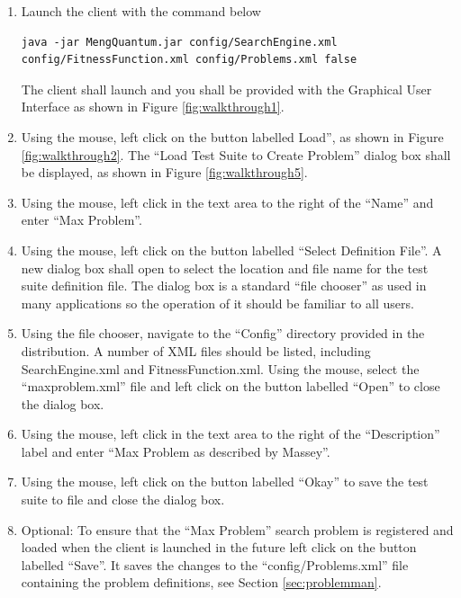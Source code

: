 \begin{enumerate}
 \item Launch the client with the command below
\begin{lstlisting}
java -jar MengQuantum.jar config/SearchEngine.xml config/FitnessFunction.xml config/Problems.xml false
\end{lstlisting}
The client shall launch and you shall be provided with the Graphical User Interface as shown in Figure \ref{fig:walkthrough1}.

\item Using the mouse, left click on the button labelled Load'', as shown in Figure \ref{fig:walkthrough2}.
The ``Load Test Suite to Create Problem'' dialog box shall be displayed, as shown in Figure \ref{fig:walkthrough5}.

\item Using the mouse, left click in the text area to the right of the ``Name'' and enter ``Max Problem''.

\item Using the mouse, left click on the button labelled ``Select Definition File''.
A new dialog box shall open to select the location and file name for the test suite definition file.
The dialog box is a standard ``file chooser'' as used in many applications so the operation of it should be familiar to all users.

\item Using the file chooser, navigate to the ``Config'' directory provided in the distribution.
A number of XML files should be listed, including SearchEngine.xml and FitnessFunction.xml.
Using the mouse, select the ``maxproblem.xml'' file and left click on the button labelled ``Open'' to close the dialog box.

\item Using the mouse, left click in the text area to the right of the ``Description'' label and enter ``Max Problem as described by Massey''.

\item Using the mouse, left click on the button labelled ``Okay'' to save the test suite to file and close the dialog box.

\item \label{enum:loadsaveprobs}Optional: To ensure that the ``Max Problem'' search problem is registered and loaded when the client is launched in the future left click on the button labelled ``Save''.
It saves the changes to the ``config/Problems.xml'' file containing the problem definitions, see Section \ref{sec:problemman}.

\end{enumerate}

